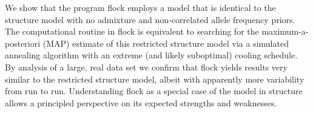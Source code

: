 
      We show that the program {\sc flock} \citep{Duc&Tur2009} employs 
a model that is identical to the {\sc structure} 
\citep{Pritchardetal2000} model with no admixture and non-correlated 
allele frequency priors. The computational routine in {\sc flock} is 
equivalent to searching for the maximum-a-posteriori (MAP) 
estimate of this restricted {\sc structure} model via a simulated 
annealing algorithm with an extreme (and likely suboptimal) cooling 
schedule.  By analysis of a large, real data set we
confirm that {\sc flock} yields results very similar to the restricted
{\sc structure} model, albeit with apparently more variability 
from run to run. Understanding {\sc flock} as a special case of the model in 
{\sc structure} allows a principled perspective on its expected 
strengths and weaknesses. 
